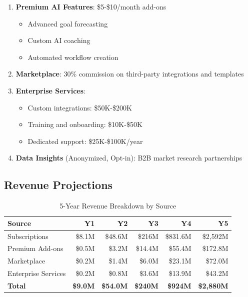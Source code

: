 \begin{enumerate}
    \item \textbf{Premium AI Features}: \$5-\$10/month add-ons
    \begin{itemize}
        \item Advanced goal forecasting
        \item Custom AI coaching
        \item Automated workflow creation
    \end{itemize}
    
    \item \textbf{Marketplace}: 30\% commission on third-party integrations and templates
    
    \item \textbf{Enterprise Services}:
    \begin{itemize}
        \item Custom integrations: \$50K-\$200K
        \item Training and onboarding: \$10K-\$50K
        \item Dedicated support: \$25K-\$100K/year
    \end{itemize}
    
    \item \textbf{Data Insights} (Anonymized, Opt-in): B2B market research partnerships
\end{enumerate}

\subsection{Revenue Projections}

\begin{table}[H]
\centering
\caption{5-Year Revenue Breakdown by Source}
\begin{tabular}{|l|r|r|r|r|r|}
\hline
\rowcolor{lightgray}
\textbf{Source} & \textbf{Y1} & \textbf{Y2} & \textbf{Y3} & \textbf{Y4} & \textbf{Y5} \\
\hline
Subscriptions & \$8.1M & \$48.6M & \$216M & \$831.6M & \$2,592M \\
\hline
Premium Add-ons & \$0.5M & \$3.2M & \$14.4M & \$55.4M & \$172.8M \\
\hline
Marketplace & \$0.2M & \$1.4M & \$6.0M & \$23.1M & \$72.0M \\
\hline
Enterprise Services & \$0.2M & \$0.8M & \$3.6M & \$13.9M & \$43.2M \\
\hline
\textbf{Total} & \textbf{\$9.0M} & \textbf{\$54.0M} & \textbf{\$240M} & \textbf{\$924M} & \textbf{\$2,880M} \\
\hline
\end{tabular}
\end{table}

